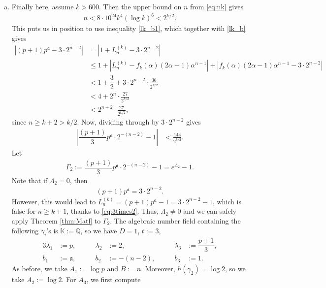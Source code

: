 \documentclass[11pt,a4paper]{article}
\numberwithin{equation}{section}
\numberwithin{table}{section}
\numberwithin{figure}{section}
\begin{document}
\begin{enumerate}[(a)]
\medskip
	
\item Finally here, assume $k>600$.	Then the upper bound on $n$ from \eqref{eq:nk} gives
\begin{align*}
	n<8\cdot 10^{24} k^{4}(\log k)^6<2^{k/2}.
\end{align*}
This puts us in position to use inequality \eqref{lk_b1}, which together with \eqref{lk_b} gives
\begin{align*}
	\left|(p+1)p^\mathfrak{a}-3\cdot2^{n-2}\right| &=\left|1+L_n^{(k)} - 3\cdot2^{n-2}\right|\\
	&\le 1+ \left|L_n^{(k)} - f_k(\alpha)(2\alpha - 1)\alpha^{n - 1}\right|+\left|f_k(\alpha)(2\alpha - 1)\alpha^{n - 1} - 3\cdot2^{n-2}\right|\\
	&< 1+\dfrac{3}{2} + 3\cdot 2^{n-2}\cdot \frac{36}{2^{k/2}}\\
	&< 4 +  2^{n}\cdot \frac{27}{2^{k/2}}\\
	&< 2^{n+2}\cdot \frac{27}{2^{k/2}},
\end{align*}
since $n \ge k+2 >k/2$. Now, dividing through by $3\cdot 2^{n-2}$ gives
\begin{align}\label{eq:lin-f2}
	\left|\dfrac{(p+1)}{3}p^\mathfrak{a}\cdot 2^{-(n-2)}-1\right| 	&<  \frac{144}{2^{k/2}}.
\end{align}
Let 
\begin{align*}
	\Gamma_2:=\dfrac{(p+1)}{3}p^\mathfrak{a}\cdot 2^{-(n-2)}-1=e^{\Lambda_2}-1.
\end{align*} 
Note that if $\Lambda_2 = 0$, then
\begin{align*}
	(p+1)p^\mathfrak{a}=3\cdot2^{n-2}.
\end{align*}
However, this would lead to $L_n^{(k)}=(p+1)p^a-1=3\cdot 2^{n-2}-1$, which is false for $n\ge k+1$, thanks to \eqref{eq:3times2}.
 Thus, $\Lambda_2\ne 0$ and we can safely apply Theorem \ref{thm:Matl} to $\Gamma_2$. The algebraic number field containing the following $\gamma_i$'s is $\mathbb{K} := \mathbb{Q}$, so we have $D = 1$, $t := 3$,
\begin{alignat*}{3}
	\lambda_{1} &:= p,         &\qquad \lambda_{2} &:= 2,         &\qquad \lambda_{3} &:= \dfrac{p+1}{3},      \\
	b_1         &:= \mathfrak{a},        &\qquad b_2    &:= -(n-2),         &\qquad b_3    &:= 1.
\end{alignat*}
As before, we take $A_1:= \log p$ and $B:=n$. Moreover, $h(\gamma_{2}) =\log 2 $, so we take $A_{2}:=\log 2$.
For $A_3$, we first compute 
\begin{align*}

\end{align*}
\end{enumerate}
\end{document}
